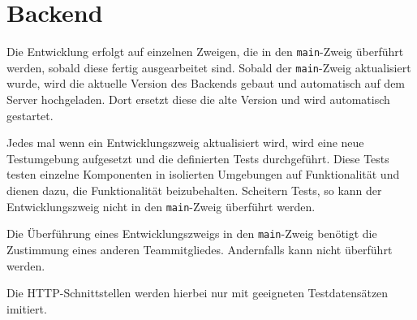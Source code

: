 \section{Backend}

Die Entwicklung erfolgt auf einzelnen Zweigen, die in den \verb#main#-Zweig überführt werden, sobald diese fertig ausgearbeitet sind.
Sobald der \verb#main#-Zweig aktualisiert wurde, wird die aktuelle Version des Backends gebaut und automatisch auf dem Server hochgeladen.
Dort ersetzt diese die alte Version und wird automatisch gestartet.

Jedes mal wenn ein Entwicklungszweig aktualisiert wird, wird eine neue Testumgebung aufgesetzt und die definierten Tests durchgeführt.
Diese Tests testen einzelne Komponenten in isolierten Umgebungen auf Funktionalität und dienen dazu, die Funktionalität beizubehalten.
Scheitern Tests, so kann der Entwicklungszweig nicht in den \verb#main#-Zweig überführt werden.

Die Überführung eines Entwicklungszweigs in den \verb#main#-Zweig benötigt die Zustimmung eines anderen Teammitgliedes.
Andernfalls kann nicht überführt werden.

Die HTTP-Schnittstellen werden hierbei nur mit geeigneten Testdatensätzen imitiert.
